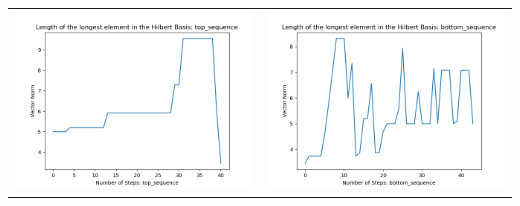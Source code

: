 \documentclass[10pt]{article}
\begin{document}
\begin{tabular}{c|c}
\begin{minipage}{.4\textwidth}
\includegraphics[width=\textwidth]{"DATA/4d/4 generators 2 bound G/top_sequence LENGTH"}
\end{minipage} &
\begin{minipage}{.4\textwidth}
\includegraphics[width=\textwidth]{"DATA/4d/4 generators 2 bound G bottomup/bottom_sequence LENGTH"}
\end{minipage}
\end{tabular}
\end{document}
